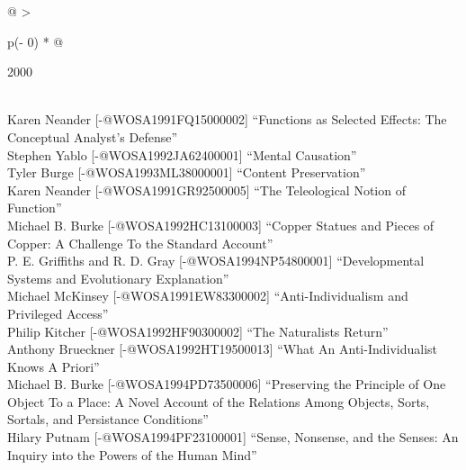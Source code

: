 \documentclass[
  10pt,
  letterpaper,
  DIV=11,
  numbers=noendperiod,
  twoside]{scrartcl}
\begin{document}
\begin{longtable}[]{@{}
  >{\raggedright\arraybackslash}p{(\columnwidth - 0\tabcolsep) * }@{}}

\caption{\label{tbl-top-ten-1991}Most cited articles published less than
ten years ago as of 2000.}

\tabularnewline

\toprule\noalign{}
\begin{minipage}[b]{\linewidth}\raggedright
2000
\end{minipage} \\
\midrule\noalign{}
\endhead
\bottomrule\noalign{}
\endlastfoot
Karen Neander {[}-@WOSA1991FQ15000002{]} ``Functions as Selected
Effects: The Conceptual Analyst's Defense'' \\
Stephen Yablo {[}-@WOSA1992JA62400001{]} ``Mental Causation'' \\
Tyler Burge {[}-@WOSA1993ML38000001{]} ``Content Preservation'' \\
Karen Neander {[}-@WOSA1991GR92500005{]} ``The Teleological Notion of
Function'' \\
Michael B. Burke {[}-@WOSA1992HC13100003{]} ``Copper Statues and Pieces
of Copper: A Challenge To the Standard Account'' \\
P. E. Griffiths and R. D. Gray {[}-@WOSA1994NP54800001{]}
``Developmental Systems and Evolutionary Explanation'' \\
Michael McKinsey {[}-@WOSA1991EW83300002{]} ``Anti-Individualism and
Privileged Access'' \\
Philip Kitcher {[}-@WOSA1992HF90300002{]} ``The Naturalists Return'' \\
Anthony Brueckner {[}-@WOSA1992HT19500013{]} ``What An
Anti-Individualist Knows A Priori'' \\
Michael B. Burke {[}-@WOSA1994PD73500006{]} ``Preserving the Principle
of One Object To a Place: A Novel Account of the Relations Among
Objects, Sorts, Sortals, and Persistance Conditions'' \\
Hilary Putnam {[}-@WOSA1994PF23100001{]} ``Sense, Nonsense, and the
Senses: An Inquiry into the Powers of the Human Mind'' \\

\end{longtable}
\end{document}
